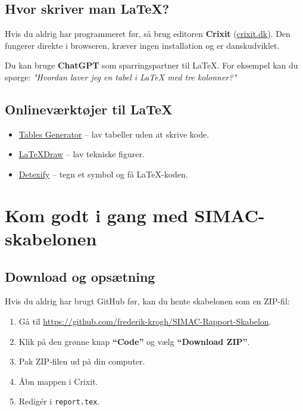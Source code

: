 \subsection{Hvor skriver man LaTeX?}
Hvis du aldrig har programmeret før, så brug editoren \textbf{Crixit} (\href{https://crixit.dk}{crixit.dk}).
Den fungerer direkte i browseren, kræver ingen installation og er danskudviklet.

Du kan bruge \textbf{ChatGPT} som sparringspartner til LaTeX.
For eksempel kan du spørge:
\textit{"Hvordan laver jeg en tabel i LaTeX med tre kolonner?"}

\subsection{Onlineværktøjer til LaTeX}
\begin{itemize}
  \item \href{https://www.tablesgenerator.com/latex_tables}{Tables Generator} – lav tabeller uden at skrive kode.
  \item \href{https://latexdraw.com}{LaTeXDraw} – lav tekniske figurer.
  \item \href{https://detexify.kirelabs.org/classify.html}{Detexify} – tegn et symbol og få LaTeX-koden.
\end{itemize}

\newpage

\section{Kom godt i gang med SIMAC-skabelonen}

\subsection{Download og opsætning}
Hvis du aldrig har brugt GitHub før, kan du hente skabelonen som en ZIP-fil:

\begin{enumerate}
  \item Gå til \href{https://github.com/frederik-krogh/SIMAC-Rapport-Skabelon}{https://github.com/frederik-krogh/SIMAC-Rapport-Skabelon}.
  \item Klik på den grønne knap \textbf{“Code”} og vælg \textbf{“Download ZIP”}.
  \item Pak ZIP-filen ud på din computer.
  \item Åbn mappen i Crixit.
  \item Redigér i \texttt{report.tex}.
\end{enumerate}

